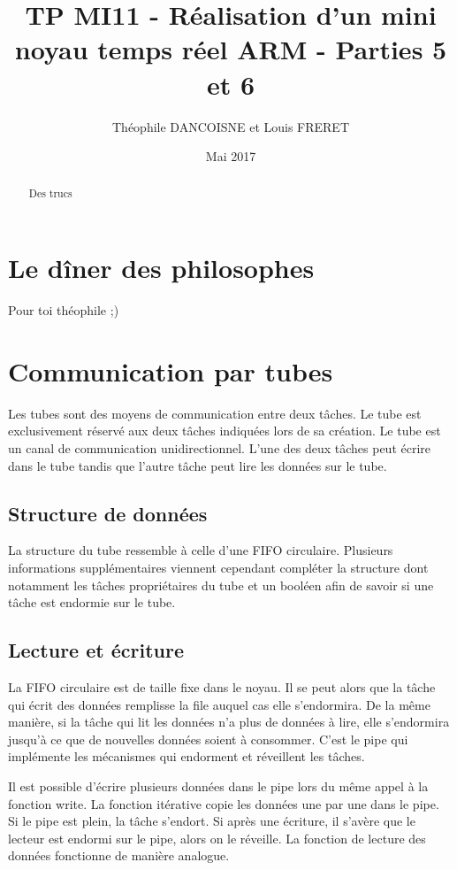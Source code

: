\documentclass{article}
\title{TP MI11 - Réalisation d’un mini noyau temps réel ARM - Parties 5 et 6}
\author{Théophile DANCOISNE et Louis FRERET}
\date{Mai 2017}
\begin{document}
\maketitle

\begin{abstract}
Des trucs
\end{abstract}

\section{Le dîner des philosophes}
Pour toi théophile ;)

\section{Communication par tubes}
Les tubes sont des moyens de communication entre deux tâches. Le tube est exclusivement réservé aux deux tâches indiquées lors de sa création.
Le tube est un canal de communication unidirectionnel. L'une des deux tâches peut écrire dans le tube tandis que l'autre tâche peut lire les données sur le tube.

\subsection{Structure de données}
La structure du tube ressemble à celle d'une FIFO circulaire. Plusieurs informations supplémentaires viennent cependant compléter la structure dont notamment les tâches propriétaires du tube et un booléen afin de savoir si une tâche est endormie sur le tube.


\subsection{Lecture et écriture}
La FIFO circulaire est de taille fixe dans le noyau. Il se peut alors que la tâche qui écrit des données remplisse la file auquel cas elle s'endormira.
De la même manière, si la tâche qui lit les données n'a plus de données à lire, elle s'endormira jusqu'à ce que de nouvelles données soient à consommer.
C'est le pipe qui implémente les mécanismes qui endorment et réveillent les tâches.

Il est possible d'écrire plusieurs données dans le pipe lors du même appel à la fonction write. La fonction itérative copie les données une par une dans le pipe. Si le pipe est plein, la tâche s'endort. Si après une écriture, il s'avère que le lecteur est endormi sur le pipe, alors on le réveille.
La fonction de lecture des données fonctionne de manière analogue.

\end{document}

